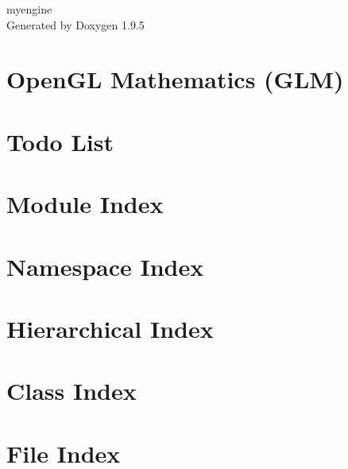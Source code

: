 \documentclass[twoside]{book}
\newcommand{\+}{\discretionary{\mbox{\scriptsize$\hookleftarrow$}}{}{}}
\newcommand{\clearemptydoublepage}{%
    \newpage{\pagestyle{empty}\cleardoublepage}%
  }
\begin{document}
  \raggedbottom
    \hypersetup{pageanchor=false,
                bookmarksnumbered=true,
                pdfencoding=unicode
               }
  \begin{titlepage}
  \vspace*{7cm}
  \begin{center}%
  {\Large myengine}\\
  \vspace*{1cm}
  {\large Generated by Doxygen 1.9.5}\\
  \end{center}
  \end{titlepage}
  \clearemptydoublepage
  \tableofcontents
  \clearemptydoublepage
  \hypersetup{pageanchor=true}
\chapter{Open\+GL Mathematics (GLM)}
\label{index}\hypertarget{index}{}
\chapter{Todo List}
\label{todo}

\chapter{Module Index}

\chapter{Namespace Index}

\chapter{Hierarchical Index}

\chapter{Class Index}

\chapter{File Index}

\end{document}
